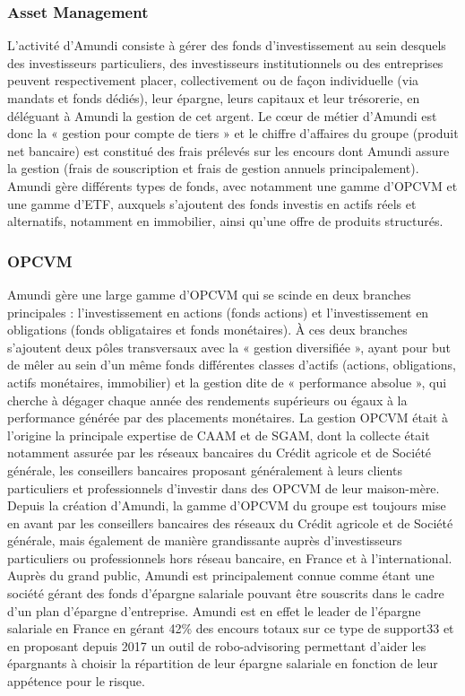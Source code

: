 \subsubsection{Asset Management}
\par L'activité d'Amundi consiste à gérer des fonds d'investissement au sein desquels des investisseurs particuliers, des investisseurs institutionnels ou des entreprises peuvent respectivement placer, collectivement ou de façon individuelle (via mandats et fonds dédiés), leur épargne, leurs capitaux et leur trésorerie, en déléguant à Amundi la gestion de cet argent. Le cœur de métier d'Amundi est donc la « gestion pour compte de tiers » et le chiffre d'affaires du groupe (produit net bancaire) est constitué des frais prélevés sur les encours dont Amundi assure la gestion (frais de souscription et frais de gestion annuels principalement). Amundi gère différents types de fonds, avec notamment une gamme d'OPCVM et une gamme d'ETF, auxquels s'ajoutent des fonds investis en actifs réels et alternatifs, notamment en immobilier, ainsi qu'une offre de produits structurés.

\subsubsection{OPCVM}
Amundi gère une large gamme d'OPCVM qui se scinde en deux branches principales : l'investissement en actions (fonds actions) et l'investissement en obligations (fonds obligataires et fonds monétaires). À ces deux branches s'ajoutent deux pôles transversaux avec la « gestion diversifiée », ayant pour but de mêler au sein d'un même fonds différentes classes d'actifs (actions, obligations, actifs monétaires, immobilier) et la gestion dite de « performance absolue », qui cherche à dégager chaque année des rendements supérieurs ou égaux à la performance générée par des placements monétaires. La gestion OPCVM était à l'origine la principale expertise de CAAM et de SGAM, dont la collecte était notamment assurée par les réseaux bancaires du Crédit agricole et de Société générale, les conseillers bancaires proposant généralement à leurs clients particuliers et professionnels d'investir dans des OPCVM de leur maison-mère. Depuis la création d'Amundi, la gamme d'OPCVM du groupe est toujours mise en avant par les conseillers bancaires des réseaux du Crédit agricole et de Société générale, mais également de manière grandissante auprès d'investisseurs particuliers ou professionnels hors réseau bancaire, en France et à l'international. Auprès du grand public, Amundi est principalement connue comme étant une société gérant des fonds d'épargne salariale pouvant être souscrits dans le cadre d'un plan d'épargne d'entreprise. Amundi est en effet le leader de l'épargne salariale en France en gérant 42\% des encours totaux sur ce type de support33 et en proposant depuis 2017 un outil de robo-advisoring permettant d'aider les épargnants à choisir la répartition de leur épargne salariale en fonction de leur appétence pour le risque.

